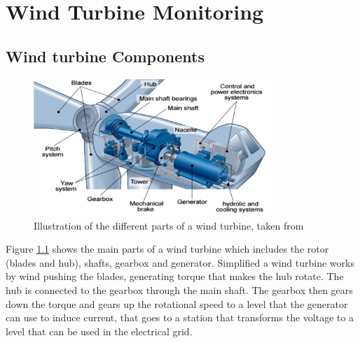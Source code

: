 \chapter{Wind Turbine Monitoring} \label{s:wt_monitoring}

\section{Wind turbine Components}
\begin{figure}[h]
    \begin{center}
    \includegraphics[width=0.8\textwidth]{wind_turbine/wt_parts.png}
    \end{center}
    \caption{Illustration of the different parts of a wind turbine, taken from \cite{adv_meth_for_wt_cond_monit_rev}}
    \label{fig:wt_parts}
\end{figure}

Figure \ref{fig:wt_parts} shows the main parts of a wind turbine which includes the rotor (blades and hub), shafts, gearbox and generator. Simplified a wind turbine works by wind pushing the blades, generating torque that makes the hub rotate. The hub is connected to the gearbox through the main shaft. The gearbox then gears down the torque and gears up the rotational speed to a level that the generator can use to induce current, that goes to a station that transforms the voltage to a level that can be used in the electrical grid. 

